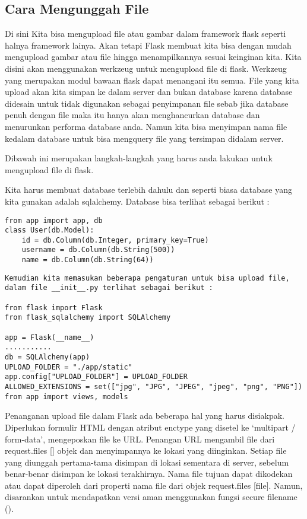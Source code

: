 \documentclass[12pt,a4paper]{article}
\begin{document}
\subsection{Cara Mengunggah File}


Di sini Kita bisa mengupload file atau gambar dalam framework flask seperti halnya framework lainya. Akan tetapi Flask membuat kita bisa dengan mudah mengupload gambar atau file hingga menampilkannya sesuai keinginan kita. Kita disini akan menggunakan werkzeug untuk mengupload file di flask. Werkzeug yang merupakan modul bawaan flask dapat menangani itu semua.
File yang kita upload akan kita simpan ke dalam server dan bukan database karena database didesain untuk tidak digunakan sebagai penyimpanan file sebab jika database penuh dengan file maka itu hanya akan menghancurkan database dan menurunkan performa database anda. Namun kita bisa menyimpan nama file kedalam database untuk bisa mengquery file yang tersimpan didalam server.

Dibawah ini merupakan langkah-langkah yang harus anda lakukan untuk mengupload file di flask.

Kita harus membuat database terlebih dahulu dan seperti biasa database yang kita gunakan adalah sqlalchemy. Database bisa terlihat sebagai berikut :

\begin{verbatim}
from app import app, db
class User(db.Model):
    id = db.Column(db.Integer, primary_key=True)
    username = db.Column(db.String(500))
    name = db.Column(db.String(64))
\end{verbatim}

\begin{verbatim}
Kemudian kita memasukan beberapa pengaturan untuk bisa upload file, 
dalam file __init__.py terlihat sebagai berikut :

from flask import Flask
from flask_sqlalchemy import SQLAlchemy

app = Flask(__name__)
...........
db = SQLAlchemy(app)
UPLOAD_FOLDER = "./app/static"
app.config["UPLOAD_FOLDER"] = UPLOAD_FOLDER
ALLOWED_EXTENSIONS = set(["jpg", "JPG", "JPEG", "jpeg", "png", "PNG"])
from app import views, models
\end{verbatim}


Penanganan upload file dalam Flask ada beberapa hal yang harus disiakpak. Diperlukan formulir HTML dengan atribut enctype yang disetel ke ‘multipart / form-data’, mengeposkan file ke URL. Penangan URL mengambil file dari request.files [] objek dan menyimpannya ke lokasi yang diinginkan.
Setiap file yang diunggah pertama-tama disimpan di lokasi sementara di server, sebelum benar-benar disimpan ke lokasi terakhirnya. Nama file tujuan dapat dikodekan atau dapat diperoleh dari properti nama file dari objek request.files [file]. Namun, disarankan untuk mendapatkan versi aman menggunakan fungsi secure filename ().
\end{document}
